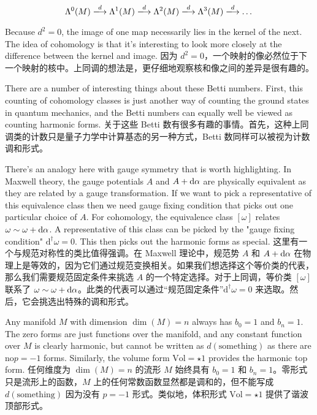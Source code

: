 \documentclass{article}
\begin{document}
\[ \Lambda^0(M) \xlongrightarrow{d} \Lambda^1(M) \xlongrightarrow{d} \Lambda^2(M) \xlongrightarrow{d} \Lambda^3(M) \xlongrightarrow{d} \dots \]

\begin{paracol}{2}

Because $d^2 = 0$, the image of one map necessarily lies in the kernel of the next. The idea of cohomology is that it’s interesting to look more closely at the difference between the kernel and image.
\switchcolumn
因为 $d^2 = 0$，一个映射的像必然位于下一个映射的核中。上同调的想法是，更仔细地观察核和像之间的差异是很有趣的。
\switchcolumn*

There are a number of interesting things about these Betti numbers. First, this counting of cohomology classes is just another way of counting the ground states in quantum mechanics, and the Betti numbers can equally well be viewed as counting harmonic forms.
\switchcolumn
关于这些 Betti 数有很多有趣的事情。首先，这种上同调类的计数只是量子力学中计算基态的另一种方式，Betti 数同样可以被视为计数调和形式。
\switchcolumn*

There’s an analogy here with gauge symmetry that is worth highlighting. In Maxwell theory, the gauge potentials $A$ and $A + \odif{\alpha}$ are physically equivalent as they are related by a gauge transformation. If we want to pick a representative of this equivalence class then we need gauge fixing condition that picks out one particular choice of $A$. For cohomology, the equivalence class $[\omega]$ relates $\omega \sim \omega + \odif{\alpha}$. A representative of this class can be picked by the "gauge fixing condition" $\mathrm{d}^{\dagger} \omega = 0$. This then picks out the harmonic forms as special.
\switchcolumn
这里有一个与规范对称性的类比值得强调。在 Maxwell 理论中，规范势 $A$ 和 $A + \odif{\alpha}$ 在物理上是等效的，因为它们通过规范变换相关。如果我们想选择这个等价类的代表，那么我们需要规范固定条件来挑选 $A$ 的一个特定选择。对于上同调，等价类 $[\omega]$ 联系了 $\omega \sim \omega + \odif{\alpha}$。此类的代表可以通过“规范固定条件”$\mathrm{d}^{\dagger} \omega = 0$ 来选取。然后，它会挑选出特殊的调和形式。
\switchcolumn*

Any manifold $M$ with dimension $\dim(M) = n$ always has $b_0 = 1$ and $b_n = 1$. The zero forms are just functions over the manifold, and any constant function over $M$ is clearly harmonic, but cannot be written as $d(\text{something})$ as there are no$p = - 1$ forms. Similarly, the volume form $\text{Vol} = \star 1$ provides the harmonic top form.
\switchcolumn
任何维度为 $\dim(M) = n$ 的流形 $M$ 始终具有 $b_0 = 1$ 和 $b_n = 1$。零形式只是流形上的函数，$M$ 上的任何常数函数显然都是调和的，但不能写成 $d(\text{something})$ 因为没有 $p = - 1$ 形式。类似地，体积形式 $\text{Vol} = \star 1$ 提供了谐波顶部形式。
\switchcolumn*


\end{paracol}
\end{document}
